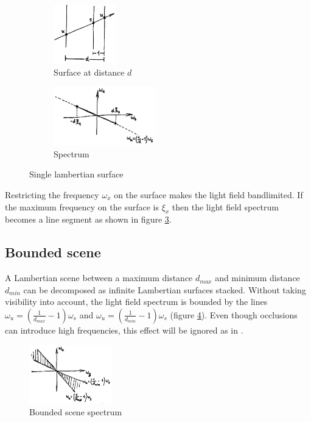 \documentclass[acmtog,review,anonymous]{acmart}
\begin{document}
\begin{figure}[h]
  \centering
  \begin{subfigure}[t]{1.1in}
    \centering
    \includegraphics[height=1in]{figures/lambsurf}
    \caption{Surface at distance $d$}\label{fig:lambsurf}
  \end{subfigure}
  \quad
  \begin{subfigure}[t]{1in}
    \centering
    \includegraphics[height=1in]{figures/lambspec}
    \caption{Spectrum}\label{fig:lambspec}
  \end{subfigure}
  \caption{Single lambertian surface}
\end{figure}

Restricting the frequency $\omega_{x}$ on the surface makes the light field bandlimited. If the maximum frequency on the surface is $\xi_{x}$ then the light field spectrum becomes a line segment as shown in figure \ref{fig:lambspec}.

\subsection{Bounded scene} \label{subsec:scene}

A Lambertian scene between a maximum distance $d_{max}$ and minimum distance $d_{min}$ can be decomposed as infinite Lambertian surfaces stacked. Without taking visibility into account, the light field spectrum is bounded by the lines $\omega_{u} = (\frac{1}{d_{max}} - 1)\omega_{s}$ and $\omega_{u} = (\frac{1}{d_{min}} - 1)\omega_{s}$ (figure \ref{fig:scenespec}). Even though occlusions can introduce high frequencies\cite{Durand:2005:FAL:1073204.1073320}, this effect will be ignored as in \cite{Chai:2000:PS:344779.344932}.

\begin{figure}[h]
  \includegraphics[height=1in]{figures/scenespec}
  \caption{Bounded scene spectrum}
  \label{fig:scenespec}
\end{figure}
\end{document}
